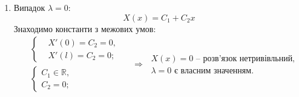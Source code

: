 \documentclass[a4paper, 14pt]{extreport}
\begin{document}
\begin{enumerate}
\begin{enumerate}[wide, labelindent=0pt]
        \item Випадок $\lambda = 0$:
        \begin{equation*}
            X(x) = C_1 + C_2 x
        \end{equation*}
        Знаходимо константи з межових умов:
        \begin{equation*}
            \begin{aligned}
                &\left\{ \begin{aligned}
                    &X'(0) = C_2 = 0, \\ 
                    &X'(l) = C_2 = 0;
                \end{aligned} \right.
                \\   
                &\left\{ \begin{aligned}
                    C_1 \in \mathbb{R}, \\ 
                    C_2 = 0;
                \end{aligned} \right.
            \end{aligned}
            \quad\Rightarrow\;
            \begin{aligned}
                X(x) = 0 \text{ -- розв'язок нетривівльний,}\\
                \lambda = 0 \text{ є власним значенням.}
            \end{aligned}
        \end{equation*}


\end{enumerate}
\end{enumerate}
\end{document}
